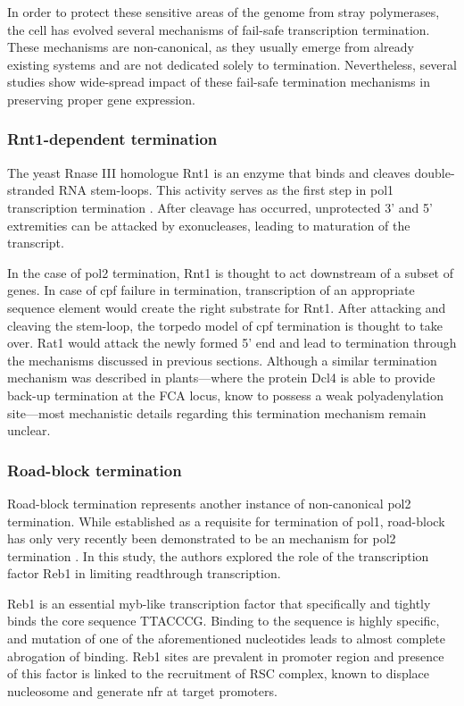 In order to protect these sensitive areas of the genome from stray polymerases, the cell has evolved several mechanisms of fail-safe transcription termination.
These mechanisms are non-canonical, as they usually emerge from already existing systems and are not dedicated solely to termination.
Nevertheless, several studies show wide-spread impact of these fail-safe termination mechanisms in preserving proper gene expression.

\subsubsection{Rnt1-dependent termination}

The yeast Rnase III homologue Rnt1 is an enzyme that binds and cleaves double-stranded RNA stem-loops. 
This activity serves as the first step in \gls{pol1} transcription termination .
After cleavage has occurred, unprotected 3' and 5' extremities can be attacked by exonucleases, leading to maturation of the transcript.

In the case of \gls{pol2} termination, Rnt1 is thought to act downstream of a subset of genes.
In case of \gls{cpf} failure in termination, transcription of an appropriate sequence element would create the right substrate for Rnt1.
After attacking and cleaving the stem-loop, the torpedo model of \gls{cpf} termination is thought to take over.
Rat1 would attack the newly formed 5' end and lead to termination through the mechanisms discussed in previous sections.
Although a similar termination mechanism was described in plants---where the protein Dcl4 is able to provide back-up termination at the FCA locus, know to possess a weak polyadenylation site---most mechanistic details regarding this termination mechanism remain unclear.

\subsubsection{Road-block termination}
  
Road-block termination represents another instance of non-canonical \gls{pol2} termination.
While established as a requisite for termination of \gls{pol1}, road-block has only very recently been demonstrated to be an \invivo{} mechanism for \gls{pol2} termination \cite{colin:2014:roadblock}.
In this study, the authors explored the role of the transcription factor Reb1 in limiting readthrough transcription.

Reb1 is an essential myb-like transcription factor that specifically and tightly binds the core sequence TTACCCG.
Binding to the sequence is highly specific, and mutation of one of the aforementioned nucleotides leads to almost complete abrogation of binding.
Reb1 sites are prevalent in promoter region and presence of this factor is linked to the recruitment of RSC complex, known to displace nucleosome and generate \gls{nfr} at target promoters.

